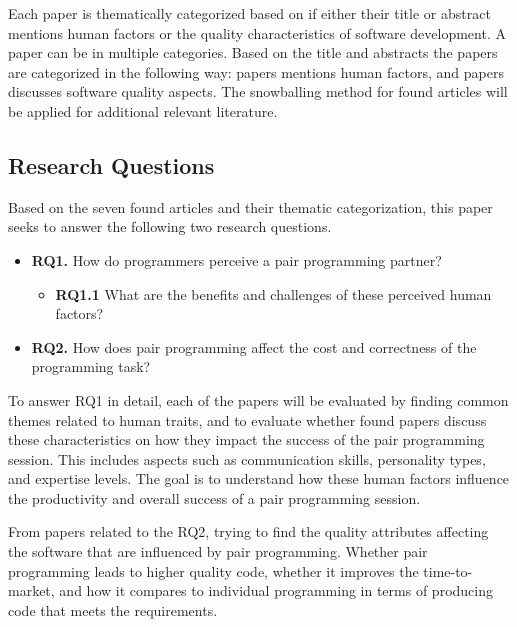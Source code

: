 \documentclass[conference]{IEEEtran}
\begin{document}
Each paper is thematically categorized based on if either their title or abstract mentions human factors or the quality characteristics of software development. A paper can be in multiple categories. Based on the title and abstracts the papers are categorized in the following way: papers \cite{10.1145/2652524.2652529, Williams2000Strengthening, 10.1145/1414004.1414026, Arisholm2007Evaluating, 10.1145/1852786.1852816, Hannay2009effectiveness} mentions human factors, and papers \cite{Williams2000Strengthening, 10.1145/1414004.1414026, Arisholm2007Evaluating, 10.1145/1159733.1159749, Hannay2009effectiveness} discusses software quality aspects. The snowballing method for found articles will be applied for additional relevant literature.

\subsection{Research Questions}

Based on the seven found articles and their thematic categorization, this paper seeks to answer the following two research questions.

\begin{itemize}
    \item \textbf{RQ1.} How do programmers perceive a pair programming partner?
    \begin{itemize}
        \item \textbf{RQ1.1} What are the benefits and challenges of these perceived human factors?
    \end{itemize}
    \item \textbf{RQ2.} How does pair programming affect the cost and correctness of the programming task?
\end{itemize}

To answer RQ1 in detail, each of the papers will be evaluated by finding common themes related to human traits, and to evaluate whether found papers discuss these characteristics on how they impact the success of the pair programming session. This includes aspects such as communication skills, personality types, and expertise levels. The goal is to understand how these human factors influence the productivity and overall success of a pair programming session.

From papers related to the RQ2, trying to find the quality attributes affecting the software that are influenced by pair programming. Whether pair programming leads to higher quality code, whether it improves the time-to-market, and how it compares to individual programming in terms of producing code that meets the requirements. 
\end{document}
